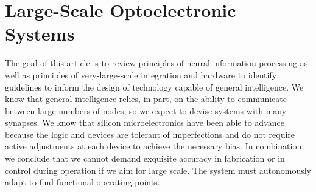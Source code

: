\section{\label{sec:scaling}Large-Scale Optoelectronic Systems}
The goal of this article is to review principles of neural information processing as well as principles of very-large-scale integration and hardware to identify guidelines to inform the design of technology capable of general intelligence. We know that general intelligence relies, in part, on the ability to communicate between large numbers of nodes, so we expect to devise systems with many synapses. We know that silicon microelectronics have been able to advance because the logic and devices are tolerant of imperfections and do not require active adjustments at each device to achieve the necessary bias. In combination, we conclude that we cannot demand exquisite accuracy in fabrication or in control during operation if we aim for large scale. The system must autonomously adapt to find functional operating points. 










